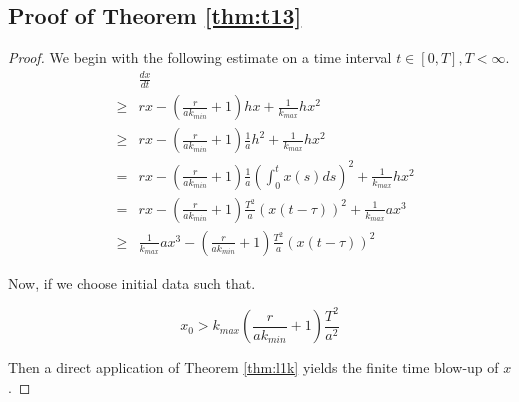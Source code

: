 \documentclass[sn-mathphys-num]{sn-jnl}
\numberwithin{equation}{section}
\numberwithin{equation}{section}
\begin{document}
\subsection{Proof of Theorem \ref{thm:t13}}
\begin{proof}
\label{proof_thm:t13}
We begin with the following estimate on a time interval $t \in [0,T], T < \infty$.
    \begin{eqnarray}
&& \frac{dx}{dt} \nonumber \\
&\geq& r x -\left( \frac{r}{a k_{min}}  + 1\right) 
h x + \frac{1}{k_{max}}hx^{2} \nonumber \\
&\geq& r x -\left( \frac{r}{a k_{min}}  + 1\right) \frac{1}{a}
h^{2} + \frac{1}{k_{max}}hx^{2} \nonumber \\
&=&r x -\left( \frac{r}{a k_{min}}  + 1\right) \frac{1}{a}
\left(\int^{t}_{0}x(s) ds\right)^{2} + \frac{1}{k_{max}}hx^{2}\nonumber \\
&=& r x - \left( \frac{r}{a k_{min}}  + 1\right) \frac{T^{2}}{a}\left(  x(t-\tau) \right)^{2} + \frac{1}{k_{max}}ax^{3} \nonumber \\
&\geq& \frac{1}{k_{max}}ax^{3} - \left( \frac{r}{a k_{min}}  + 1\right) \frac{T^{2}}{a}\left(  x(t-\tau) \right)^{2}
\end{eqnarray}

Now, if we choose initial data such that.

\begin{equation}
x_{0} >  k_{max} \left( \frac{r}{a k_{min}}  + 1\right)\frac{T^{2}}{a^{2}}
\end{equation}

Then a direct application of Theorem \ref{thm:l1k} yields the finite time blow-up of $x$.

\end{proof}




%


\end{document}
